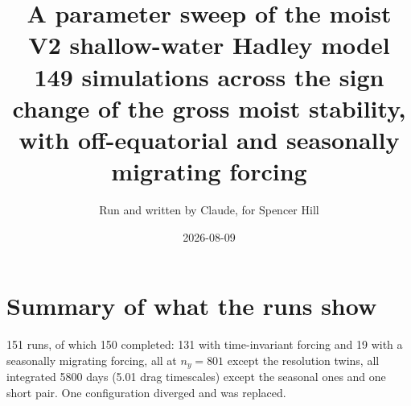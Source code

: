 \documentclass[11pt]{article}
\title{A parameter sweep of the moist V2 shallow-water Hadley model\\
\large 149 simulations across the sign change of the gross moist stability,
with off-equatorial and seasonally migrating forcing}
\author{Run and written by Claude, for Spencer Hill}
\date{2026-08-09}
\begin{document}
\maketitle

\tableofcontents

\section{Summary of what the runs show}
\label{sec:summary}

151 runs, of which 150 completed: 131 with time-invariant forcing and 19 with a
seasonally migrating forcing, all at $n_y = 801$ except the resolution twins, all
integrated 5800 days (5.01 drag timescales) except the seasonal ones and one
short pair. One configuration diverged and was replaced.
\end{document}
